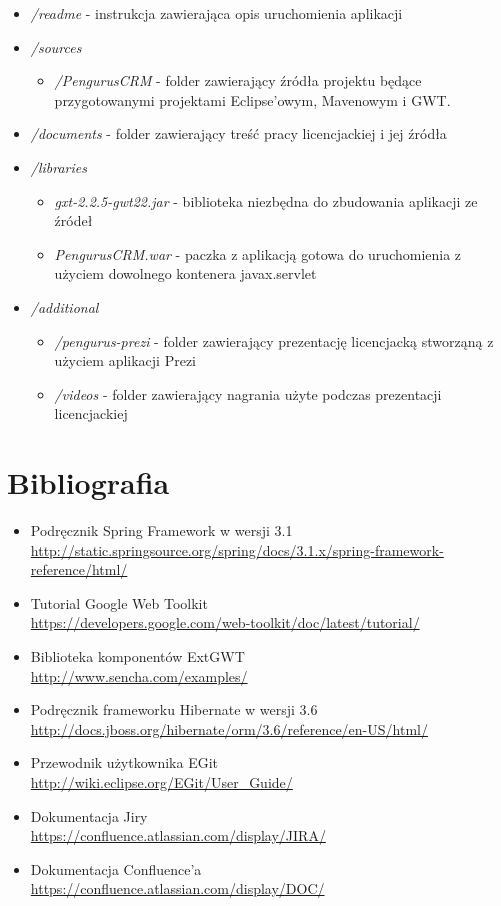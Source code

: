 \documentclass[licencjacka]{pracamgr}
\begin{document}
\begin{itemize}

\item \textit{/readme} - instrukcja zawierająca opis uruchomienia aplikacji
\item \textit{/sources}
\begin{itemize}
	\item \textit{/PengurusCRM} - folder zawierający źródła projektu będące przygotowanymi projektami Eclipse'owym, Mavenowym i GWT.
\end{itemize}
\item \textit{/documents} - folder zawierający treść pracy licencjackiej i jej źródła
\item \textit{/libraries}
\begin{itemize}
	\item \textit{gxt-2.2.5-gwt22.jar} - biblioteka niezbędna do zbudowania aplikacji ze źródeł
	\item \textit{PengurusCRM.war} - paczka z aplikacją gotowa do uruchomienia z użyciem dowolnego kontenera javax.servlet
\end{itemize}
\item \textit{/additional}
\begin{itemize}
	\item \textit{/pengurus-prezi} - folder zawierający prezentację licencjacką stworząną z użyciem aplikacji Prezi
	\item \textit{/videos} - folder zawierający nagrania użyte podczas prezentacji licencjackiej
\end{itemize}
\end{itemize}

\chapter{Bibliografia}

\begin{itemize}
\item Podręcznik Spring Framework w wersji 3.1 \\
\url{http://static.springsource.org/spring/docs/3.1.x/spring-framework-reference/html/}
\item Tutorial Google Web Toolkit \\
\url{https://developers.google.com/web-toolkit/doc/latest/tutorial/}
\item Biblioteka komponentów ExtGWT \\
\url{http://www.sencha.com/examples/}
\item Podręcznik frameworku Hibernate w wersji 3.6 \\
\url{http://docs.jboss.org/hibernate/orm/3.6/reference/en-US/html/}
\item Przewodnik użytkownika EGit \\
\url{http://wiki.eclipse.org/EGit/User_Guide/}
\item Dokumentacja Jiry \\
\url{https://confluence.atlassian.com/display/JIRA/}
\item Dokumentacja Confluence'a \\
\url{https://confluence.atlassian.com/display/DOC/}

\end{itemize}
\end{document}
